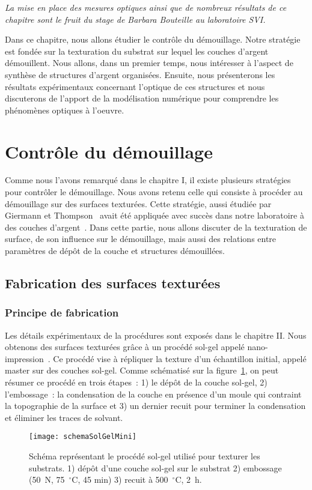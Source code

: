 \minitoc
\newpage

\textit{La mise en place des mesures optiques ainsi que de nombreux résultats de ce chapitre sont le fruit du stage de Barbara Bouteille au laboratoire SVI.}\par 
Dans ce chapitre, nous allons étudier le contrôle du démouillage. Notre stratégie est fondée sur la texturation du substrat sur lequel les couches d’argent démouillent. Nous allons, dans un premier temps, nous intéresser à l’aspect de synthèse de structures d’argent organisées. Ensuite, nous présenterons les résultats expérimentaux concernant l’optique de ces structures et nous discuterons de l’apport de la modélisation numérique pour comprendre les phénomènes optiques à l’oeuvre.

\section{Contrôle du démouillage}
Comme nous l’avons remarqué dans le chapitre I, il existe plusieurs stratégies pour contrôler le démouillage. Nous avons retenu celle qui consiste à procéder au démouillage sur des surfaces texturées. Cette stratégie, aussi étudiée par Giermann et Thompson~\cite{giermann2005solid, giermann2011requirements} avait été appliquée avec succès dans notre laboratoire à des couches d’argent~\cite{le2014self}. Dans cette partie, nous allons discuter de la texturation de surface, de son influence sur le démouillage, mais aussi des relations entre paramètres de dépôt de la couche et structures démouillées.\par 

	\subsection{Fabrication des surfaces texturées}
	\subsubsection{Principe de fabrication}
Les détails expérimentaux de la procédures sont exposés dans le chapitre II. Nous obtenons des surfaces texturées grâce à un procédé sol-gel appelé nano-impression~\cite{le2014self,chou1996nanoimprint}. Ce procédé vise à répliquer la texture d’un échantillon initial, appelé \og master \fg{} sur des couches sol-gel. Comme schématisé sur la figure~\ref{schemaSolGelMini}, on peut résumer ce procédé en trois étapes~: 1) le dépôt de la couche sol-gel, 2) l’embossage~: la condensation de la couche en présence d’un moule qui contraint la topographie de la surface et 3) un dernier recuit pour terminer la condensation et éliminer les traces de solvant.
\begin{figure}[!htb]
\centering
\texttt{[image: schemaSolGelMini]}
\caption{Schéma représentant le procédé sol-gel utilisé pour texturer les substrats. 1) dépôt d’une couche sol-gel sur le substrat 2) embossage (50~N, 75~$^\circ$C, 45 min) 3) recuit à 500~$^\circ$C, 2~h.}
\label{schemaSolGelMini}
\end{figure}

